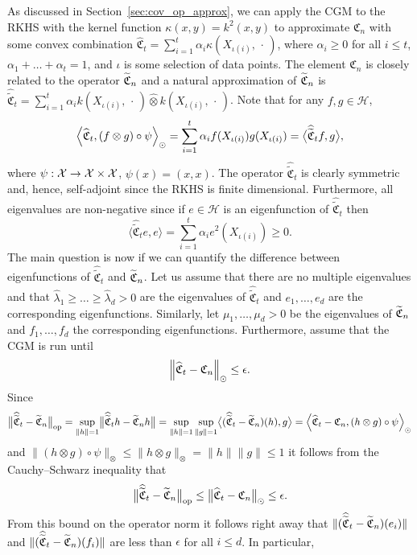 \documentclass[AHL,Unicode,longabstracts,published]{cedram}
\theoremstyle{remark}
\DeclareMathOperator{\opp}{op}
\newcommand{\X}{\mathcal{X}}
\newcommand{\cH}{\mathcal{H}}
\newcommand{\fkC}{\mathfrak{C}}
\newcommand{\wh}{\widehat}
\let\oldtilde\tilde
\renewcommand*{\tilde}[1]{\mathchoice{\widetilde{#1}}{\widetilde{#1}}{\oldtilde{#1}}{\oldtilde{#1}}}
\renewcommand*{\to}{\mathchoice{\longrightarrow}{\rightarrow}{\rightarrow}{\rightarrow}}
\let\originalleft\left
\let\originalright\right
\renewcommand{\left}{\mathopen{}\mathclose\bgroup\originalleft}
\renewcommand{\right}{\aftergroup\egroup\originalright}
\begin{document}
As discussed in Section~\ref{sec:cov_op_approx}, we can apply the CGM to the RKHS with the kernel function $\kappa(x,y) = k^2(x,y)$ to approximate $\fkC_n$ with some convex combination $\wh{\fkC}_t = \sum_{i=1}^t \alpha_i \kappa(X_{\iota(i)},\,\cdot\,)$, where $\alpha_i \geq 0$ for all $i\leq t$, $\alpha_1 + \dots + \alpha_t = 1$, and $\iota$ is some selection of data points. The element $\fkC_n$ is closely related to the operator $\tilde{\fkC}_n$ and a natural approximation of $\tilde{\fkC}_n$ is $\wh{\oldtilde{\fkC}}_t = \sum_{i=1}^t \alpha_i k(X_{\iota(i)}, \,\cdot\,) \wh{\otimes} k(X_{\iota(i)}, \,\cdot\,)$. Note that for any $f,g \in \cH$,
\[
\left\langle \wh{\fkC}_t, (f \otimes g) \circ \psi \right\rangle_\odot = \sum_{i=1}^t \alpha_i f(X_{\iota(i)}) g(X_{\iota(i)}) = \bigl\langle \wh{\oldtilde{\fkC}}_t f, g \bigr\rangle,
\]
where $\psi:\X \to \X \times \X$, $\psi(x) = (x,x)$. The operator $\wh{\oldtilde{\fkC}}_t$ is clearly symmetric and, hence, self-adjoint since the RKHS is finite dimensional. Furthermore, all eigenvalues are non-negative since if $e \in \cH$ is an eigenfunction of $\wh{\oldtilde{\fkC}}_t$ then
\[
\bigl\langle \wh{\oldtilde{\fkC}}_t e, e \bigr\rangle = \sum_{i=1}^t \alpha_i e^2(X_{\iota(i)}) \geq 0.
\]
The main question is now if we can quantify the difference between eigenfunctions of $
\wh{\oldtilde{\fkC}}_t$ and $\tilde{\fkC}_n$. Let us assume that there are no multiple eigenvalues and that $\wh \lambda_1 \geq \dots \geq \wh \lambda_d >0$ are the eigenvalues of $\wh{\oldtilde{\fkC}}_t$ and $e_1,\dots, e_d$ are the corresponding eigenfunctions. Similarly, let $\mu_1,\dots, \mu_d > 0$ be the eigenvalues of $\tilde{\fkC}_n$ and $f_1,\dots, f_d$ the corresponding eigenfunctions. Furthermore, assume that the CGM is run until
\[
\left\| \wh{\fkC}_t - \fkC_n\right\|_\odot \leq \epsilon.
\]
Since
\[
\bigl\|\wh{\oldtilde{\fkC}}_t - \tilde{\fkC}_n \bigr\|_{\opp} = \sup_{\|h\|=1}
\bigl\|\wh{\oldtilde{\fkC}}_t h - \tilde{\fkC}_n h \bigr\| = \sup_{\|h\|=1} \sup_{\|g\|=1}
\bigl\langle (\wh{\oldtilde{\fkC}}_t - \tilde{\fkC}_n)(h), g \bigr\rangle = \left\langle \wh{\fkC}_t - \fkC_n, (h \otimes g) \circ \psi \right\rangle_\odot
\]
and $\|(h \otimes g) \circ \psi \|_\otimes \leq \|h \otimes g\|_\otimes = \|h\|\|g\| \leq 1$ it follows from the Cauchy--Schwarz inequality that
\[
\bigl\|\wh{\oldtilde{\fkC}}_t - \tilde{\fkC}_n \bigr\|_{\opp} \leq \bigl\| \wh{\fkC}_t - \fkC_n\bigr\|_\odot \leq \epsilon.
\]
From this bound on the operator norm it follows right away that $\|(\wh{\oldtilde{\fkC}}_t - \tilde{\fkC}_n) (e_i)\|$ and $\|(\wh{\oldtilde{\fkC}}_t - \tilde{\fkC}_n) (f_i)\|$ are less than $\epsilon$ for all $i\leq d$. In particular,
\end{document}
